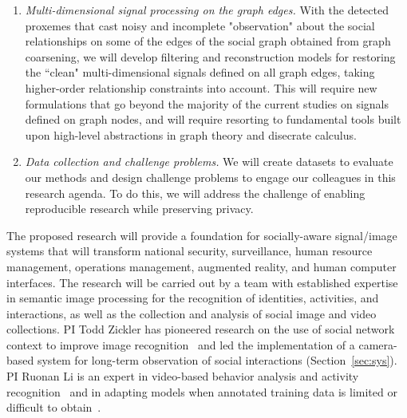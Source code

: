 \begin{enumerate}
\vspace{-0.1in}\item \emph{Multi-dimensional signal processing on the graph edges.} With the detected proxemes that cast noisy and incomplete "observation" about the social relationships on some of the edges of the social graph obtained from graph coarsening, we will develop filtering and reconstruction models for restoring the ``clean" multi-dimensional signals defined on all graph edges, taking higher-order relationship constraints into account. This will require new formulations that go beyond the majority of the current studies on signals defined on graph nodes, and will require resorting to fundamental tools built upon high-level abstractions in graph theory and disecrate calculus.


\vspace{-0.1in}\item \emph{Data collection and challenge problems.} We will create datasets to evaluate our methods and design challenge problems to engage our colleagues in this research agenda. To do this, we will address the challenge of enabling reproducible research while preserving privacy.

\end{enumerate}

The proposed research will provide a foundation for socially-aware signal/image systems that will transform national security, surveillance, human resource management, operations management, augmented reality, and human computer interfaces. The research will be carried out by a team with established expertise in semantic image processing for the recognition of identities, activities, and interactions, as well as the collection and analysis of social image and video collections. PI Todd Zickler has pioneered research on the use of social network context to improve image recognition~\cite{Stone2008,Stone2010} and led the implementation of a camera-based system for long-term observation of social interactions (Section~\ref{sec:sys}). PI Ruonan Li is an expert in video-based behavior analysis and activity recognition~\cite{groupdet2013,LiIJCV2012,LiPAMI2012,Li2010} and in adapting models when annotated training data is limited or difficult to obtain~\cite{LiZickler2012,Li2011}. 








